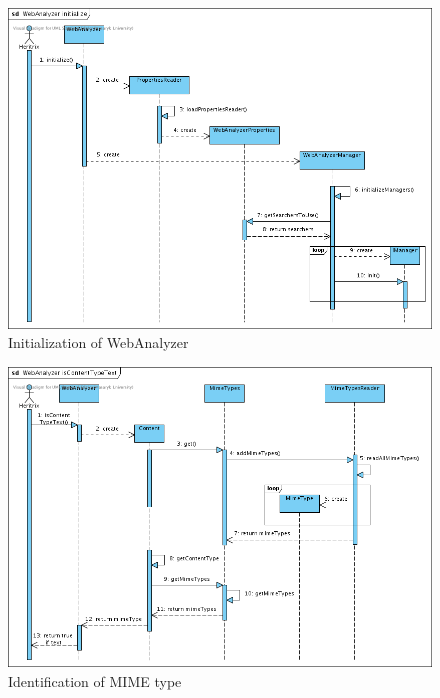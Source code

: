 \documentclass[11pt,a4paper]{article}
\begin{document}
\begin{center}

\begin{figure}[htp]
\centering
\includegraphics[width=120mm]{SD1.png}
\caption{Initialization of WebAnalyzer}\label{fig:erptsqfit1}
\end{figure}

\begin{figure}[htp]
\centering
\includegraphics[width=120mm]{SD2.png}
\caption{Identification of MIME type}\label{fig:erptsqfit2}
\end{figure}


\end{center}
\end{document}
